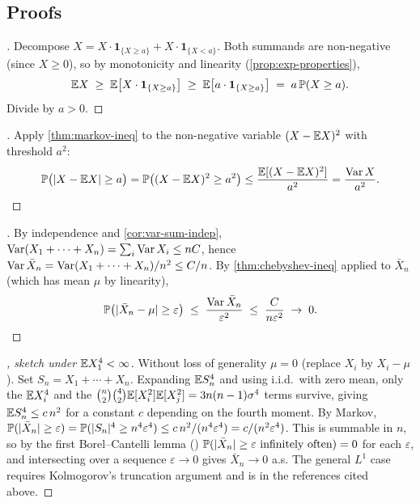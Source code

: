 \subsection*{Proofs}

\begin{proof}[]
Decompose $X = X \cdot \mathbf{1}_{\{X \geq a\}} + X \cdot \mathbf{1}_{\{X < a\}}$.
Both summands are non-negative (since $X \geq 0$), so by monotonicity
and linearity (\cref{prop:exp-properties}),
\[
  \mathbb{E} X \;\geq\; \mathbb{E}\bigl[X \cdot \mathbf{1}_{\{X \geq a\}}\bigr] \;\geq\; \mathbb{E}\bigl[a \cdot \mathbf{1}_{\{X \geq a\}}\bigr] \;=\; a\, \mathbb{P}(X \geq a).
\]
Divide by $a > 0$.
\end{proof}

\begin{proof}[]
Apply \cref{thm:markov-ineq} to the non-negative variable $(X - \mathbb{E} X)^2$
with threshold $a^2$:
\[
  \mathbb{P}\bigl(|X - \mathbb{E} X| \geq a\bigr) = \mathbb{P}\bigl((X - \mathbb{E} X)^2 \geq a^2\bigr) \leq \frac{\mathbb{E}[(X - \mathbb{E} X)^2]}{a^2} = \frac{\operatorname{Var} X}{a^2}. \qedhere
\]
\end{proof}

\begin{proof}[]
By independence and \cref{cor:var-sum-indep},
$\operatorname{Var}(X_1 + \cdots + X_n) = \sum_i \operatorname{Var} X_i \leq nC$, hence
$\operatorname{Var} \bar X_n = \operatorname{Var}(X_1 + \cdots + X_n)/n^2 \leq C/n$. By
\cref{thm:chebyshev-ineq} applied to $\bar X_n$ (which has mean
$\mu$ by linearity),
\[
  \mathbb{P}\bigl(|\bar X_n - \mu| \geq \varepsilon\bigr) \;\leq\; \frac{\operatorname{Var} \bar X_n}{\varepsilon^2} \;\leq\; \frac{C}{n \varepsilon^2} \;\to\; 0.
\]
\end{proof}

\begin{proof}[, sketch under $\mathbb{E} X_1^4 < \infty$]
Without loss of generality $\mu = 0$ (replace $X_i$ by $X_i - \mu$).
Set $S_n = X_1 + \cdots + X_n$. Expanding $\mathbb{E} S_n^4$ and using
i.i.d.\ with zero mean, only the $\mathbb{E} X_i^4$ and the
$\binom{n}{2} \binom{4}{2} \mathbb{E}[X_i^2] \mathbb{E}[X_j^2] = 3 n(n-1) \sigma^4$
terms survive, giving $\mathbb{E} S_n^4 \leq c\, n^2$ for a constant
$c$ depending on the fourth moment. By Markov,
$\mathbb{P}(|\bar X_n| \geq \varepsilon) = \mathbb{P}(|S_n|^4 \geq n^4 \varepsilon^4) \leq c\, n^2 / (n^4 \varepsilon^4) = c/(n^2 \varepsilon^4)$.
This is summable in $n$, so by the first Borel–Cantelli lemma
(\cite[Ch.~II, \S~10]{Shiryaev1989}) $\mathbb{P}(|\bar X_n| \geq \varepsilon \text{ infinitely often}) = 0$
for each $\varepsilon$, and intersecting over a sequence
$\varepsilon \to 0$ gives $\bar X_n \to 0$ a.s. The general
$L^1$ case requires Kolmogorov's truncation argument and is in
the references cited above.
\end{proof}


